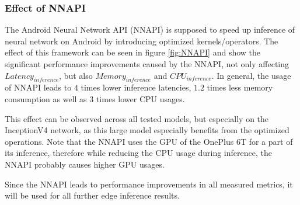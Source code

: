 \subsubsection{Effect of NNAPI}
The Android Neural Network API (NNAPI) is supposed to speed up inference of neural network on Android by introducing optimized kernels/operators. 
The effect of this framework can be seen in figure \ref{fig:NNAPI} and show the significant performance improvements caused by the NNAPI, not only affecting $Latency_{inference}$, but also $Memory_{inference}$ and $CPU_{inference}$.
In general, the usage of NNAPI leads to $4$ times lower inference latencies, $1.2$ times less memory consumption as well as $3$ times lower CPU usages.

This effect can be observed across all tested models, but especially on the InceptionV4 network, as this large model especially benefits from the optimized operations.
Note that the NNAPI uses the GPU of the OnePlus 6T for a part of its inference, therefore while reducing the CPU usage during inference, the NNAPI probably causes higher GPU usages.

Since the NNAPI leads to performance improvements in all measured metrics, it will be used for all further edge inference results.

